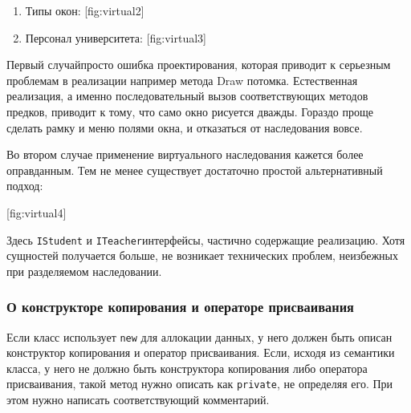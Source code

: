 \newpage
\begin{enumerate}
\item Типы окон:
[fig:virtual2]
\item Персонал университета:
[fig:virtual3]
\end{enumerate}

Первый случай\mdash просто ошибка проектирования, которая приводит к серьезным проблемам в реализации например метода Draw потомка. Естественная реализация, а именно последовательный вызов соответствующих методов предков, приводит к тому, что само окно рисуется дважды. Гораздо проще сделать рамку и меню полями окна, и отказаться от наследования вовсе.

Во втором случае применение виртуального наследования кажется более оправданным. Тем не менее существует достаточно простой альтернативный подход:

[fig:virtual4]

Здесь \lstinline|IStudent| и \lstinline|ITeacher|\mdash интерфейсы, частично содержащие реализацию. Хотя сущностей получается больше, не возникает технических проблем, неизбежных при разделяемом наследовании.



\subsubsection{О конструкторе копирования и операторе присваивания}

Если класс использует \lstinline|new| для аллокации данных, у него должен быть описан конструктор копирования и оператор присваивания. Если, исходя из семантики класса, у него не должно быть конструктора копирования либо оператора присваивания, такой метод нужно описать как \lstinline|private|, не определяя его. При этом нужно написать соответствующий комментарий.

